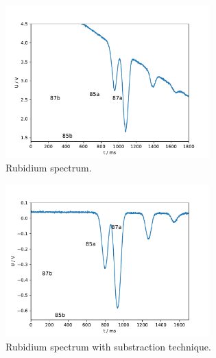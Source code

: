 \begin{figure}
  \centering
  \includegraphics[width=0.7\textwidth]{Pics/Rb_spectrum.pdf}
  \caption{Rubidium spectrum.}
  \label{fig:spectrum}
\end{figure}

\begin{figure}
  \centering
  \includegraphics[width=0.7\textwidth]{Pics/Rb_spectrum_subst.pdf}
  \caption{Rubidium spectrum with substraction technique.}
  \label{fig:spectrum_sub}
\end{figure}
